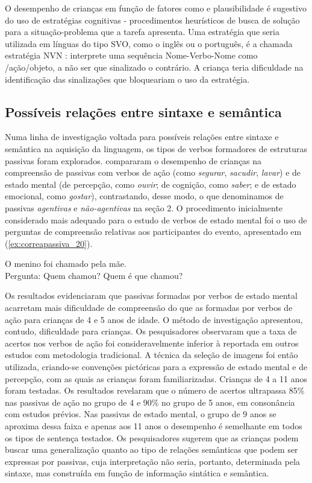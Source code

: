 \documentclass[output=paper]{LSP/langsci}
\begin{document}
O desempenho de crianças em função de fatores como  e plausibilidade é sugestivo do uso de estratégias cognitivas - procedimentos heurísticos de busca de solução para a situação-problema que a tarefa apresenta. Uma estratégia que seria utilizada em línguas do tipo SVO, como o inglês ou o português, é a chamada estratégia NVN \citep{bever1970}: interprete uma sequência Nome-Verbo-Nome como /ação/objeto, a não ser que sinalizado o contrário. A criança teria dificuldade na identificação das sinalizações que bloqueariam o uso da estratégia.

\subsection{Possíveis relações entre sintaxe e semântica}
\label{subsec:correapassiva_possiveis_relacoes}

Numa linha de investigação voltada para possíveis relações entre sintaxe e semântica na aquisição da linguagem, os tipos de verbos formadores de estruturas passivas foram explorados. \citet{maratsos_etal1985} compararam o desempenho de crianças na compreensão de passivas com verbos de ação (como \textit{segurar}, \textit{sacudir}, \textit{lavar}) e de estado mental (de percepção, como \textit{ouvir}; de cognição, como \textit{saber}; e de estado emocional, como \textit{gostar}), contrastando, desse modo, o que denominamos de passivas \textit{agentivas} e \textit{não-agentivas} na seção 2. O procedimento inicialmente considerado mais adequado para o estudo de verbos de estado mental foi o uso de perguntas de compreensão relativas aos participantes do evento, apresentado em (\ref{ex:correapassiva_20}).

\ea\label{ex:correapassiva_20}
O menino foi chamado pela mãe.\\
Pergunta: Quem chamou? Quem é que chamou?
\z

Os resultados evidenciaram que passivas formadas por verbos de estado mental acarretam mais dificuldade de compreensão do que as formadas por verbos de ação para crianças de 4 e 5 anos de idade. O método de investigação apresentou, contudo, dificuldade para crianças. Os pesquisadores observaram que a taxa de acertos nos verbos de ação foi consideravelmente inferior à reportada em outros estudos com metodologia tradicional. A técnica da seleção de imagens foi então utilizada, criando-se convenções pictóricas para a expressão de estado mental e de percepção, com as quais as crianças foram familiarizadas. Crianças de 4 a 11 anos foram testadas. Os resultados revelaram que o número de acertos ultrapassa 85\% nas passivas de ação no grupo de 4 e 90\% no grupo de 5 anos, em consonância com estudos prévios. Nas passivas de estado mental, o grupo de 9 anos se aproxima dessa faixa e apenas aos 11 anos o desempenho é semelhante em todos os tipos de sentença testados. Os pesquisadores sugerem que as crianças podem buscar uma generalização quanto ao tipo de relações semânticas que podem ser expressas por passivas, cuja interpretação não seria, portanto, determinada pela sintaxe, mas construída em função de informação sintática e semântica. 
\end{document}
